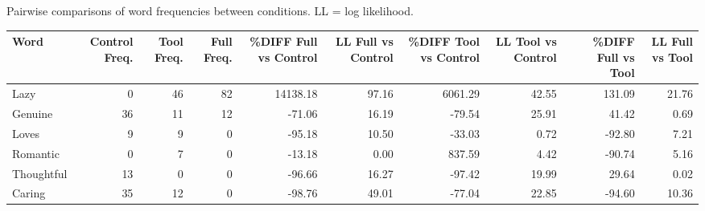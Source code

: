 \documentclass[
  man,
  floatsintext,
  longtable,
  nolmodern,
  notxfonts,
  notimes,
  colorlinks=true,linkcolor=blue,citecolor=blue,urlcolor=blue]{apa7}
\begin{document}
\begin{landscape}

\begin{supptbl}[H]

\caption{\label{supptbl-text-analysis-study5}Pairwise comparisons of
word frequencies between conditions. LL = log likelihood.}

\begin{minipage}{\linewidth}

\centering\begingroup\fontsize{8}{10}\selectfont

\begin{tabular}{lrrrrrrrrr}
\toprule
Word & Control
Freq. & Tool
Freq. & Full
Freq. & \%DIFF
Full vs Control & LL
Full vs Control & \%DIFF
Tool vs Control & LL
Tool vs Control & \%DIFF
Full vs Tool & LL
Full vs Tool\\
\midrule
Lazy & 0 & 46 & 82 & 14138.18 & 97.16 & 6061.29 & 42.55 & 131.09 & 21.76\\
Genuine & 36 & 11 & 12 & -71.06 & 16.19 & -79.54 & 25.91 & 41.42 & 0.69\\
Loves & 9 & 9 & 0 & -95.18 & 10.50 & -33.03 & 0.72 & -92.80 & 7.21\\
Romantic & 0 & 7 & 0 & -13.18 & 0.00 & 837.59 & 4.42 & -90.74 & 5.16\\
Thoughtful & 13 & 0 & 0 & -96.66 & 16.27 & -97.42 & 19.99 & 29.64 & 0.02\\
Caring & 35 & 12 & 0 & -98.76 & 49.01 & -77.04 & 22.85 & -94.60 & 10.36\\
\bottomrule
\end{tabular}
\endgroup{}

\end{minipage}%

\end{supptbl}%

\end{landscape}

\newpage
\end{document}

